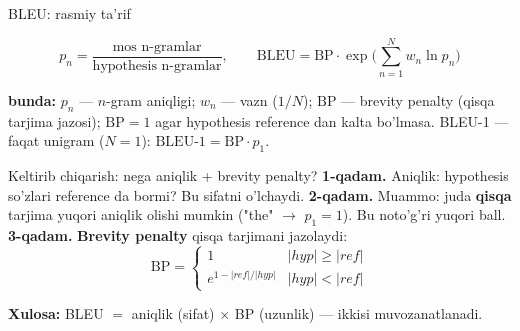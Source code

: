 \documentclass[aspectratio=169,11pt]{beamer}
\newcommand{\bunda}[1]{{\small\textbf{bunda:}\; #1}}
\begin{document}
\begin{frame}{BLEU: rasmiy ta'rif}
  \begin{tcolorbox}[defbox,title={Ta'rif: BLEU (soddalashtirilgan)}]
    \vspace{-0.4em}
    $$ p_n = \frac{\text{mos n-gramlar}}{\text{hypothesis n-gramlar}}, \qquad
       \mathrm{BLEU} = \mathrm{BP}\cdot \exp\!\Big(\sum_{n=1}^{N} w_n \ln p_n\Big) $$
  \end{tcolorbox}
  \vspace{2pt}
  \bunda{$p_n$ --- $n$-gram aniqligi; $w_n$ --- vazn ($1/N$); $\mathrm{BP}$ ---
  brevity penalty (qisqa tarjima jazosi); $\mathrm{BP}=1$ agar hypothesis
  reference dan kalta bo'lmasa.}
  \vspace{4pt}
  \footnotesize BLEU-1 --- faqat unigram ($N{=}1$): $\mathrm{BLEU\text{-}1}=\mathrm{BP}\cdot p_1$.
\end{frame}

\begin{frame}{Keltirib chiqarish: nega aniqlik + brevity penalty?}
  \textbf{1-qadam.} Aniqlik: hypothesis so'zlari reference da bormi? Bu sifatni
  o'lchaydi.
  \pause
  \textbf{2-qadam.} Muammo: juda \textbf{qisqa} tarjima yuqori aniqlik olishi
  mumkin ("the" $\to$ $p_1{=}1$). Bu noto'g'ri yuqori ball.
  \pause
  \textbf{3-qadam.} \textbf{Brevity penalty} qisqa tarjimani jazolaydi:
  $$ \mathrm{BP}=\begin{cases}1 & |hyp|\ge|ref|\\ e^{1-|ref|/|hyp|} & |hyp|<|ref|\end{cases} $$
  \begin{tcolorbox}[okbox,top=2pt,bottom=2pt]
    \small \textbf{Xulosa:} BLEU $=$ aniqlik (sifat) $\times$ BP (uzunlik) ---
    ikkisi muvozanatlanadi.
  \end{tcolorbox}
\end{frame}
\end{document}
